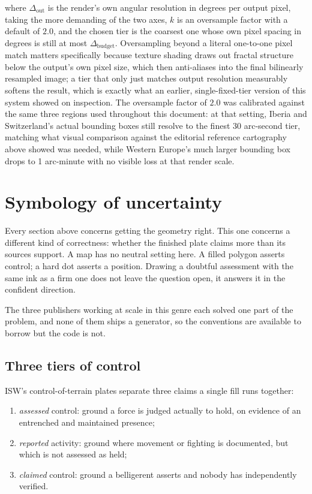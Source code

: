 \documentclass[11pt]{article}
\begin{document}
where $\Delta_{\text{out}}$ is the render's own angular resolution in
degrees per output pixel, taking the more demanding of the two axes,
$k$ is an oversample factor with a default of $2.0$, and the chosen
tier is the coarsest one whose own pixel spacing in degrees is still
at most $\Delta_{\text{budget}}$. Oversampling beyond a literal one-to-one
pixel match matters specifically because texture shading draws out
fractal structure below the output's own pixel size, which then
anti-aliases into the final bilinearly resampled image; a tier that
only just matches output resolution measurably softens the result,
which is exactly what an earlier, single-fixed-tier version of this
system showed on inspection. The oversample factor of $2.0$ was
calibrated against the same three regions used throughout this
document: at that setting, Iberia and Switzerland's actual bounding
boxes still resolve to the finest 30 arc-second tier, matching what
visual comparison against the editorial reference cartography above
showed was needed, while Western Europe's much larger bounding box
drops to 1 arc-minute with no visible loss at that render scale.

\clearpage
\section{Symbology of uncertainty}
\label{sec:uncertainty}

Every section above concerns getting the geometry right. This one
concerns a different kind of correctness: whether the finished plate
claims more than its sources support. A map has no neutral setting here.
A filled polygon asserts control; a hard dot asserts a position. Drawing
a doubtful assessment with the same ink as a firm one does not leave the
question open, it answers it in the confident direction.

The three publishers working at scale in this genre each solved one part
of the problem, and none of them ships a generator, so the conventions
are available to borrow but the code is not.

\subsection{Three tiers of control}

ISW's control-of-terrain plates \cite{isw-control-of-terrain} separate
three claims a single fill runs together:

\begin{enumerate}
  \item \emph{assessed} control: ground a force is judged actually to
        hold, on evidence of an entrenched and maintained presence;
  \item \emph{reported} activity: ground where movement or fighting is
        documented, but which is not assessed as held;
  \item \emph{claimed} control: ground a belligerent asserts and nobody
        has independently verified.
\end{enumerate}
\end{document}
